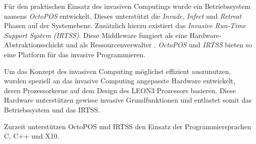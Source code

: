 Für den praktischen Einsatz des invasiven Computings wurde ein Betriebssystem namens \textit{OctoPOS} entwickelt. 
Dieses unterstützt die \textit{Invade}, \textit{Infect} und \textit{Retreat} Phasen auf der Systemebene.
Zusätzlich hierzu existiert das \textit{Invasive Run-Time Support System (IRTSS)}. Diese Middleware
\cite{invasiveRISC} fungiert als eine Hardware-Abstraktionsschicht und als
Ressourcenverwalter \cite{invasiveManyCore}.
\textit{OctoPOS} und \textit{IRTSS} bieten so eine Platform für das invasive Programmieren.\cite{octopos}

Um das Konzept des invasiven Computing möglichst effizient auszunutzen, wurden speziell an das invasive Computing
angepasste Hardware entwickelt, deren Prozessorkerne auf dem Design des LEON3 Prozessors basieren.
Diese Hardware unterstützen gewisse invasive Grundfunktionen und entlastet somit das Betriebssystem und das IRTSS.
\cite{invasiveArrays}

Zurzeit unterstützen OctoPOS und IRTSS den Einsatz der Programmiersprachen C, C++ und X10.